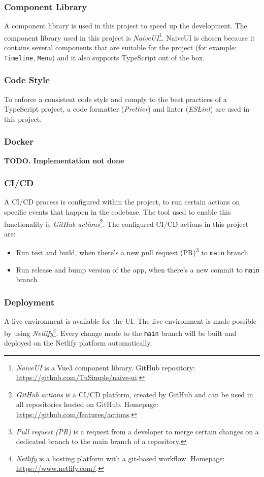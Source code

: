  \subsubsection{Component Library}
  A component library is used in this project to speed up the development. The component library used in this project is \emph{NaiveUI}\footnote{\emph{NaiveUI} is a Vue3 component library. GitHub repository: \url{https://github.com/TuSimple/naive-ui}.}. NaiveUI is chosen because it contains several components that are suitable for the project (for example: \verb}Timeline}, \verb}Menu}) and it also supports TypeScript out of the box.

  \subsubsection{Code Style}
  To enforce a consistent code style and comply to the best practices of a TypeScript project, a code formatter (\emph{Prettier}) and linter (\emph{ESLint}) are used in this project. 

  \subsubsection{Docker}
  \textbf{TODO. Implementation not done}

  \subsubsection{CI/CD}
  A CI/CD process is configured within the project, to run certain actions on specific events that happen in the codebase. The tool used to enable this functionality is \emph{GitHub actions}\footnote{\emph{GitHub actions} is a CI/CD platform, created by GitHub and can be used in all repositories hosted on GitHub. Homepage: \url{https://github.com/features/actions}.}. The configured CI/CD actions in this project are:

   \begin{itemize}
    \item Run test and build, when there's a new pull request (PR)\footnote{\emph{Pull request (PR)} is a request from a developer to merge certain changes on a dedicated branch to the main branch of a repository.} to \verb;main; branch
    \item Run release and bump version of the app, when there's a new commit to \verb;main; branch
   \end{itemize}
  
  \subsubsection{Deployment}
  A live environment is available for the UI. The live environment is made possible by using \emph{Netlify}\footnote{\emph{Netlify} is a hosting platform with a git-based workflow. Homepage: \url{https://www.netlify.com/}.}. Every change made to the \verb;main; branch will be built and deployed on the Netlify platform automatically. 

